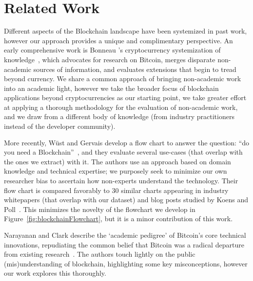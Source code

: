 
\section{Related Work}
\label{sec:related-works}

Different aspects of the Blockchain landscape have been systemized in past work, however our approach provides a unique and complimentary perspective. An early comprehensive work is Bonneau \etal's cryptocurrency systemization of knowledge~\cite{BMC+15}, which advocates for research on Bitcoin, merges disparate non-academic sources of information, and evaluates extensions that begin to tread beyond currency. We share a common approach of bringing non-academic work into an academic light, however we take the broader focus of blockchain applications beyond cryptocurrencies as our starting point, we take greater effort at applying a thorough methodology for the evaluation of non-academic work, and we draw from a different body of knowledge (\ie from industry practitioners instead of the developer community).

More recently, W{\"u}st and Gervais develop a flow chart to answer the question: ``do you need a Blockchain''~\cite{Wust17}, and they evaluate several use-cases (that overlap with the ones we extract) with it. The authors use an approach based on domain knowledge and technical expertise; we purposely seek to minimize our own researcher bias to ascertain how non-experts understand the technology. Their flow chart is compared favorably to 30 similar charts appearing in industry whitepapers (that overlap with our dataset) and blog posts studied by Koens and Poll~\cite{}. This minimizes the novelty of the flowchart we develop in Figure~\ref{fig:blockchainFlowchart}, but it is a minor contribution of this work. 

Narayanan and Clark describe the `academic pedigree' of Bitcoin's core technical innovations, repudiating the common belief that Bitcoin was a radical departure from existing research~\cite{Narayanan17}. The authors touch lightly on the public (mis)understanding of blockchain, highlighting some key misconceptions, however our work explores this thoroughly.


